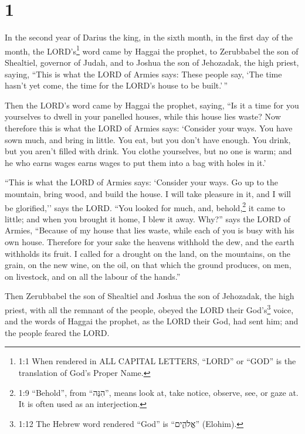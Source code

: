 \hypertarget{section}{%
\section{1}\label{section}}

 In the second year of Darius the king, in the sixth month,
in the first day of the month, the LORD's\footnote{1:1 When rendered in
  ALL CAPITAL LETTERS, ``LORD'' or ``GOD'' is the translation of God's
  Proper Name.} word came by Haggai the prophet, to Zerubbabel the son
of Shealtiel, governor of Judah, and to Joshua the son of Jehozadak, the
high priest, saying,  ``This is what the LORD of Armies
says: These people say, `The time hasn't yet come, the time for the
LORD's house to be built.'\,''

 Then the LORD's word came by Haggai the prophet, saying,
 ``Is it a time for you yourselves to dwell in your panelled
houses, while this house lies waste?  Now therefore this is
what the LORD of Armies says: `Consider your ways.  You have
sown much, and bring in little. You eat, but you don't have enough. You
drink, but you aren't filled with drink. You clothe yourselves, but no
one is warm; and he who earns wages earns wages to put them into a bag
with holes in it.'

 ``This is what the LORD of Armies says: `Consider your
ways.  Go up to the mountain, bring wood, and build the
house. I will take pleasure in it, and I will be glorified,'' says the
LORD.  ``You looked for much, and, behold,\footnote{1:9
  ``Behold'', from ``הִנֵּה'', means look at, take notice, observe, see,
  or gaze at. It is often used as an interjection.} it came to little;
and when you brought it home, I blew it away. Why?'' says the LORD of
Armies, ``Because of my house that lies waste, while each of you is busy
with his own house.  Therefore for your sake the heavens
withhold the dew, and the earth withholds its fruit.  I
called for a drought on the land, on the mountains, on the grain, on the
new wine, on the oil, on that which the ground produces, on men, on
livestock, and on all the labour of the hands.''

 Then Zerubbabel the son of Shealtiel and Joshua the son of
Jehozadak, the high priest, with all the remnant of the people, obeyed
the LORD their God's\footnote{1:12 The Hebrew word rendered ``God'' is
  ``אֱלֹהִ֑ים'' (Elohim).} voice, and the words of Haggai the prophet,
as the LORD their God, had sent him; and the people feared the LORD.

